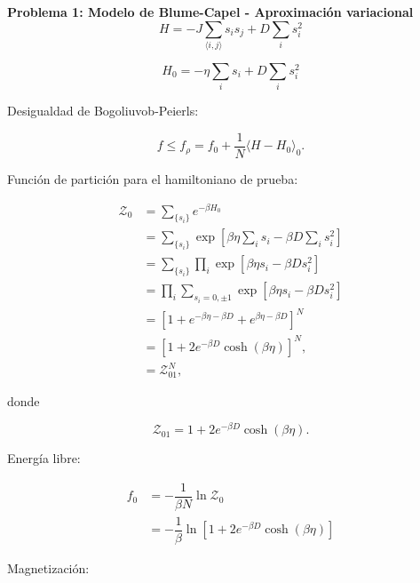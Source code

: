 \documentclass[10pt]{article}
\begin{document}
\textbf{Problema 1: Modelo de Blume-Capel - Aproximaci\'on variacional}
\\

\begin{equation}
H = -J \sum_{\langle i,j\rangle} s_i s_j + D \sum_i s_i^2
\end{equation}

\begin{equation}
H_0 = -\eta \sum_i s_i + D \sum_i s_i^2
\end{equation}

Desigualdad de Bogoliuvob-Peierls:

\begin{equation}
f \leq f_{\rho} = f_0 + \dfrac{1}{N} \langle H - H_0 \rangle_0.
\end{equation}

Funci\'on de partici\'on para el hamiltoniano de prueba:

\begin{align}
\mathcal{Z}_0 &= \sum_{\lbrace s_i\rbrace} e^{-\beta H_0} \nonumber \\
&= \sum_{\lbrace s_i\rbrace} \exp \left[ \beta \eta \sum_i s_i - \beta D \sum_i s_i^2 \right] \nonumber \\
&= \sum_{\lbrace s_i\rbrace} \prod_i  \exp \left[ \beta \eta s_i - \beta D  s_i^2 \right] \nonumber \\
&= \prod_i \sum_{s_i=0,\pm1} \exp \left[ \beta \eta s_i - \beta D  s_i^2 \right] \nonumber \\
&= \left[1 + e^{-\beta \eta -\beta D} + e^{\beta \eta -\beta D} \right]^N \nonumber \\
&= \left[1 + 2e^{-\beta D} \cosh\left(\beta \eta\right) \right]^N, \nonumber \\
&= \mathcal{Z}_{01}^N,
\end{align}

donde 

\begin{equation}
\mathcal{Z}_{01} = 1 + 2e^{-\beta D} \cosh\left(\beta \eta\right).
\end{equation}

Energ\'ia libre:

\begin{align}
f_0 &= -\dfrac{1}{\beta N} \ln \mathcal{Z}_0 \nonumber \\
&= -\dfrac{1}{\beta} \ln \left[ 1 + 2e^{-\beta D} \cosh\left(\beta \eta\right) \right]
\end{align}

Magnetizaci\'on:
\end{document}
